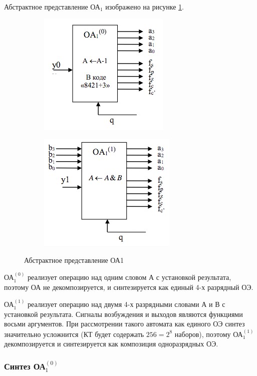 Абстрактное представление ОА$_1$ изображено на рисунке \ref{figure:abs_oa1}.

\begin{figure}[H]
	\begin{subfigure}[b]{0.3\textwidth}
		\includegraphics[scale=0.7]{images/abs10.png}
	\end{subfigure}
	\qquad
	\begin{subfigure}[b]{0.3\textwidth}
		\includegraphics[scale=0.7]{images/abs11.png}
	\end{subfigure}
	\caption{Абстрактное представление ОА1}
	\label{figure:abs_oa1}
\end{figure}

ОА$^{(0)}_{1}$ реализует операцию над одним словом $А$ с установкой результата, поэтому ОА не декомпозируется, и синтезируется как единый 4-х разрядный ОЭ.

ОА$^{(1)}_{1}$ реализует операцию над двумя 4-х разрядными словами $А$ и $В$ с установкой результата. Сигналы возбуждения и выходов являются функциями восьми аргументов. При рассмотрении такого автомата как единого ОЭ синтез значительно усложнится (КТ будет содержать $256 = 2^8$ наборов), поэтому ОА$^{(1)}_{1}$ декомпозируется и синтезируется как композиция одноразрядных ОЭ.


\subsubsection{Синтез ОА$^{(0)}_{1}$}

